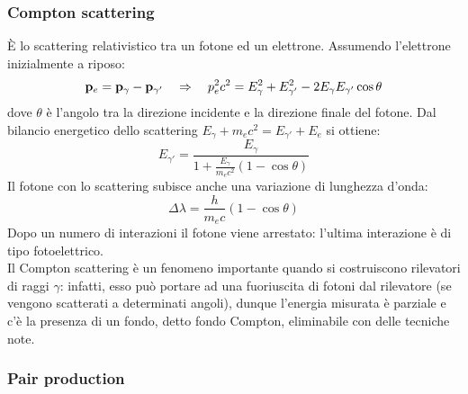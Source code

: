 \subsubsection{Compton scattering}

È lo scattering relativistico tra un fotone ed un elettrone. Assumendo l'elettrone inizialmente a riposo:
\begin{equation*}
	\mathbf{p}_e = \mathbf{p}_{\gamma} - \mathbf{p}_{\gamma'} \quad\Rightarrow\quad p_e^2 c^2 = E_{\gamma}^2 + E_{\gamma'}^2 - 2E_{\gamma} E_{\gamma'} \cos \theta
\end{equation*}
dove $ \theta $ è l'angolo tra la direzione incidente e la direzione finale del fotone. Dal bilancio energetico dello scattering $ E_{\gamma} + m_e c^2 = E_{\gamma'} + E_e $ si ottiene:
\begin{equation}
	E_{\gamma'} = \frac{E_{\gamma}}{1 + \frac{E_{\gamma}}{m_e c^2} (1 - \cos \theta)}
	\label{eq:3.11}
\end{equation}
Il fotone con lo scattering subisce anche una variazione di lunghezza d'onda:
\begin{equation}
	\Delta \lambda = \frac{h}{m_e c} (1 - \cos \theta)
	\label{eq:3.12}
\end{equation}
Dopo un numero di interazioni il fotone viene arrestato: l'ultima interazione è di tipo fotoelettrico.\\
Il Compton scattering è un fenomeno importante quando si costruiscono rilevatori di raggi $ \gamma $: infatti, esso può portare ad una fuoriuscita di fotoni dal rilevatore (se vengono scatterati a determinati angoli), dunque l'energia misurata è parziale e c'è la presenza di un fondo, detto fondo Compton, eliminabile con delle tecniche note.

\subsubsection{Pair production}

